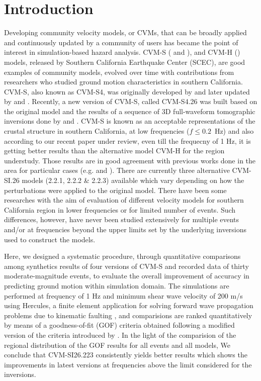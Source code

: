 \section{Introduction}

Developing community velocity models, or CVMs, that can be broadly applied and continuously updated by a community of users has became the point of interest in simulation-based hazard analysis. CVM-S (\citet{Magistrale_2000_BSSA} and \citet{Kohler_2003_BSSA}), and CVM-H (\citet{Suss_2003_JGR}) models, released by Southern California Earthquake Center (SCEC), are good examples of community models, evolved over time with contributions from researchers who studied ground motion characteristics in southern California. CVM-S, also known as CVM-S4, was originally developed by \citet{Magistrale_1996_BSSA} and later updated by \citet{Magistrale_2000_BSSA} and \citet{Kohler_2003_BSSA}. Recently, a new version of CVM-S, called CVM-S4.26 was built based on the original model and the results of a sequence of 3D full-waveform tomographic inversions done by \citet{Chen_2007_BSSA} and \citet{Lee_2014_JGR}. CVM-S is known as an acceptable representations of the crustal structure in southern California, at low frequencies ($f \leq 0.2$~Hz) and also according to our recent paper under review\citet{Taborda_2016_Proc}, even till the frequecny of 1 Hz, it is getting better results than the alternative model CVM-H for the region understudy. Those results are in good agreement with previous works done in the area for particular cases (e.g. \citet{Taborda_2014_BSSA} and \citet{Lee_2014_SRL}). There are currently three alternative CVM-SI.26 models (2.2.1, 2.2.2 \& 2.2.3) available which vary depending on how the perturbations were applied to the original model. There have been some researches with the aim of evaluation of different velocity models for southern California region in lower frequencies or for limited number of events. Such differences, however, have never been studied extensively for multiple events and/or at frequencies beyond the upper limits set by the underlying inversions used to construct the models.\par

Here, we designed a systematic procedure, through quantitative comparisons among synthetics results of four versions of CVM-S and recorded data of thirty moderate-magnitude events, to evaluate the overall improvement of accuracy in predicting ground motion within simulation domain. The simulations are performed at frequency of 1 Hz and minimum shear wave velocity of 200 m/s using Hercules, a finite element application for solving forward wave propagation problems due to kinematic faulting \citep{Tu_2006_Proc, Taborda_2010_Tech}, and comparisions are ranked quantitatively by means of a goodness-of-fit (GOF) criteria obtained following a modified version of the criteria introduced by \citet{Anderson_2004_Proc}. In the light of the comparision of the regional distribution of the GOF results for all events and all models, We conclude that CVM-SI26.223 consistently yields better results which shows the improvements in latest versions at frequencies above the limit considered for the inversions. 
